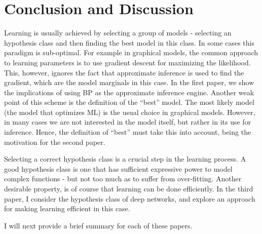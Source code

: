 \chapter{Conclusion and Discussion } %
\label{con} %
  Learning is usually achieved by selecting a group of models - selecting an hypothesis class and then finding the best model in this class.
  In some cases this paradigm is sub-optimal.
  For example in graphical models, the common approach to learning parameters is to use gradient descent for maximizing the likelihood.
  This, however, ignores the fact that approximate inference is used to find the gradient, which are the model marginals in this case.
  In the first paper, we show the implications of using BP as the approximate inference engine. Another weak point of this scheme is the definition of the ``best'' model. The most likely model (the model that optimizes ML) is the usual choice in graphical models. However, in many cases we are not interested in the model itself, but rather in its use for inference. Hence, the definition of ``best'' must take this into account, being the motivation for the second paper.

Selecting a correct hypothesis class is a crucial step in the learning
process.  A good hypothesis class is one that has sufficient expressive
power to model complex functions - but not too much as to suffer from
over-fitting. Another desirable property, is of course that learning can be done efficiently.  In the third paper, I consider the hypothesis class of deep networks, and explore an approach for making learning efficient in this case.

I will next provide a brief summary for each of these papers.

